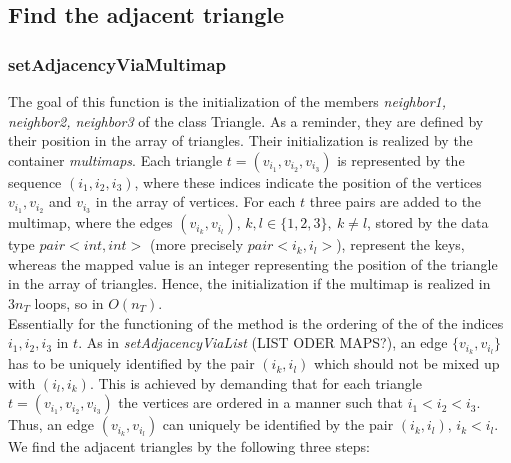 \documentclass[10pt]{article}
\begin{document}
\subsection{Find the adjacent triangle}

\subsubsection{setAdjacencyViaMultimap} \label{multimap}

The goal of this function is the initialization of the members {\itshape neighbor1, neighbor2, neighbor3} of the class Triangle. As a reminder, they are defined by their position in the array of triangles. Their initialization is realized by the container {\itshape multimaps}. 
Each triangle $ t = (v_{i_1},v_{i_2},v_{i_3}) $ is represented by the sequence $ (i_1,i_2,i_3) $, where these indices indicate the position of the vertices $v_{i_1},v_{i_2}$ and $v_{i_3}$ in the array of vertices. 
For each $ t $ three pairs are added to the multimap, where the edges $(v_{i_k},v_{i_l}), \, k,l \in \{1,2,3\}, \ k \neq l $, stored by the data type $ pair<int,int> $ (more precisely $ pair<i_k,i_l> $), represent the keys, whereas the mapped value is an integer representing the position of the triangle in the array of triangles. Hence, the initialization if the multimap is realized in $ 3n_T $ loops, so in $ O(n_T) $. \\
Essentially for the functioning of the method is the ordering of the of the indices $ i_1,i_2,i_3 $ in $ t $. As in {\itshape setAdjacencyViaList} (LIST ODER MAPS?), an edge $ \{ v_{i_k}, v_{i_l}\} $
 has to be uniquely identified by the pair $ (i_k,i_l) $ which should not be mixed up with $(i_l,i_k) $. This is achieved by demanding that for each triangle $ t =  (v_{i_1},v_{i_2},v_{i_3})$ the vertices are ordered in a manner such that $ i_1 < i_2 < i_3 $. Thus, an edge $(v_{i_k},v_{i_l}) $ can uniquely be identified by the pair $ (i_k,i_l), \, i_k < i_l $. \\
 We find the adjacent triangles by the following three steps: 
\end{document}
